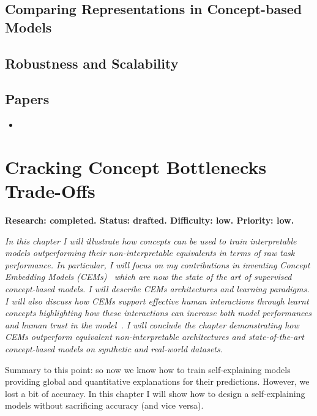 \documentclass[withindex,glossary]{cam-thesis}
\theoremstyle{plain}
\theoremstyle{definition}
\theoremstyle{remark}
\begin{document}
\section{Comparing Representations in Concept-based Models}

\section{Robustness and Scalability}

\section*{Papers}
\nobibliography*
\begin{itemize}
    \item {}
\end{itemize}



\chapter{Cracking Concept Bottlenecks Trade-Offs} \label{chapter:cem}
\textbf{Research: completed. Status: drafted. Difficulty: low. Priority: low.}

\textit{In this chapter I will illustrate how concepts can be used to train interpretable models outperforming their non-interpretable equivalents in terms of raw task performance. In particular, I will focus on my contributions in inventing Concept Embedding Models (CEMs)~\citep{zarlenga2022concept} which are now the state of the art of supervised concept-based models. I will describe CEMs architectures and learning paradigms. I will also discuss how CEMs support effective human interactions through learnt concepts highlighting how these interactions can increase both model performances and human trust in the model~\citep{shen2022trust}. I will conclude the chapter demonstrating how CEMs outperform equivalent non-interpretable architectures and state-of-the-art concept-based models on synthetic and real-world datasets.}

Summary to this point: so now we know how to train self-explaining models providing global and quantitative explanations for their predictions. However, we lost a bit of accuracy. In this chapter I will show how to design a self-explaining models without sacrificing accuracy (and vice versa).
\end{document}
